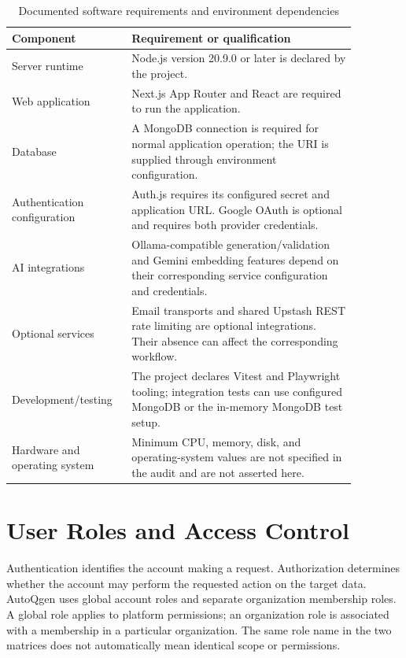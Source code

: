 \begin{table}[H]
    \centering
    \caption{Documented software requirements and environment dependencies}
    \label{tab:software-requirements}
    \begin{tabular}{|p{0.27\linewidth}|p{0.60\linewidth}|}
        \hline
        \textbf{Component} & \textbf{Requirement or qualification} \\
        \hline
        Server runtime & Node.js version 20.9.0 or later is declared by the project. \\
        \hline
        Web application & Next.js App Router and React are required to run the application. \\
        \hline
        Database & A MongoDB connection is required for normal application operation; the URI is supplied through environment configuration. \\
        \hline
        Authentication configuration & Auth.js requires its configured secret and application URL. Google OAuth is optional and requires both provider credentials. \\
        \hline
        AI integrations & Ollama-compatible generation/validation and Gemini embedding features depend on their corresponding service configuration and credentials. \\
        \hline
        Optional services & Email transports and shared Upstash REST rate limiting are optional integrations. Their absence can affect the corresponding workflow. \\
        \hline
        Development/testing & The project declares Vitest and Playwright tooling; integration tests can use configured MongoDB or the in-memory MongoDB test setup. \\
        \hline
        Hardware and operating system & Minimum CPU, memory, disk, and operating-system values are not specified in the audit and are not asserted here. \\
        \hline
    \end{tabular}
\end{table}

\section{User Roles and Access Control}

Authentication identifies the account making a request. Authorization determines whether the account may perform the requested action on the target data. AutoQgen uses global account roles and separate organization membership roles. A global role applies to platform permissions; an organization role is associated with a membership in a particular organization. The same role name in the two matrices does not automatically mean identical scope or permissions.

